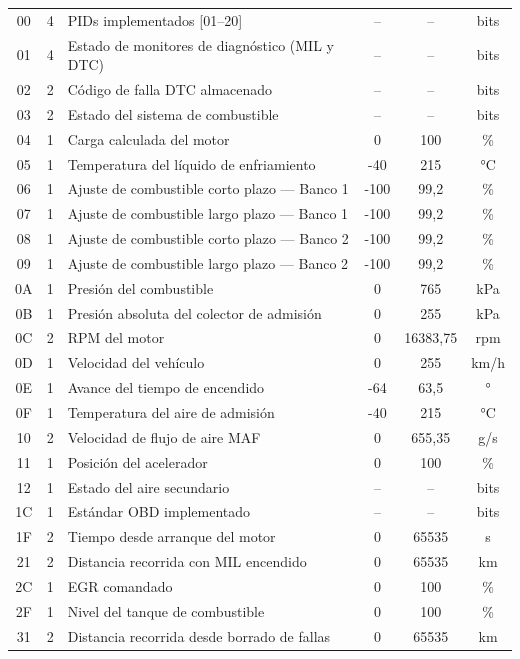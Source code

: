 \begin{supertabular}{ccp{7cm}ccc}
	00 & 4 & PIDs implementados [01--20] & -- & -- & bits \\
	01 & 4 & Estado de monitores de diagnóstico (MIL y DTC) & -- & -- & bits \\
	02 & 2 & Código de falla DTC almacenado & -- & -- & bits \\
	03 & 2 & Estado del sistema de combustible & -- & -- & bits \\
	04 & 1 & Carga calculada del motor & 0 & 100 & \% \\
	05 & 1 & Temperatura del líquido de enfriamiento & -40 & 215 & °C \\
	06 & 1 & Ajuste de combustible corto plazo — Banco 1 & -100 & 99,2 & \% \\
	07 & 1 & Ajuste de combustible largo plazo — Banco 1 & -100 & 99,2 & \% \\
	08 & 1 & Ajuste de combustible corto plazo — Banco 2 & -100 & 99,2 & \% \\
	09 & 1 & Ajuste de combustible largo plazo — Banco 2 & -100 & 99,2 & \% \\
	0A & 1 & Presión del combustible & 0 & 765 & kPa \\
	0B & 1 & Presión absoluta del colector de admisión & 0 & 255 & kPa \\
	0C & 2 & RPM del motor & 0 & 16383,75 & rpm \\
	0D & 1 & Velocidad del vehículo & 0 & 255 & km/h \\
	0E & 1 & Avance del tiempo de encendido & -64 & 63,5 & ° \\
	0F & 1 & Temperatura del aire de admisión & -40 & 215 & °C \\
	10 & 2 & Velocidad de flujo de aire MAF & 0 & 655,35 & g/s \\
	11 & 1 & Posición del acelerador & 0 & 100 & \% \\
	12 & 1 & Estado del aire secundario & -- & -- & bits \\
	1C & 1 & Estándar OBD implementado & -- & -- & bits \\
	1F & 2 & Tiempo desde arranque del motor & 0 & 65535 & s \\
	21 & 2 & Distancia recorrida con MIL encendido & 0 & 65535 & km \\
	2C & 1 & EGR comandado & 0 & 100 & \% \\
	2F & 1 & Nivel del tanque de combustible & 0 & 100 & \% \\
	31 & 2 & Distancia recorrida desde borrado de fallas & 0 & 65535 & km \\

\end{supertabular}
